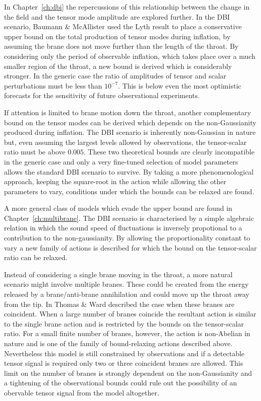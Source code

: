 In Chapter~\ref{ch:dbi} the repercussions of this relationship between the change in
the field and the tensor mode amplitude are explored further. In the DBI scenario,
Baumann \& McAllister \cite{bmpaper} used the Lyth result to place a conservative
upper bound on the total production of tensor modes during inflation, by assuming the
brane does not move further than the length of the throat. By considering only the
period of observable inflation, which takes place over a much smaller region of the
throat, a new bound is derived which is considerably stronger. In the generic
case the ratio of amplitudes of tensor and scalar perturbations must be less than
$10^{-7}$. This is below  even the most optimistic forecasts for
the sensitivity of future observational experiments. 

If attention is limited to brane motion down the throat, another complementary bound
on the tensor modes can be derived which depends on the non-Gaussianity produced
during inflation. The DBI scenario is inherently non-Gaussian in nature but, even
assuming the largest levels allowed by observations, the tensor-scalar ratio must be
above $0.005$. These two theoretical bounds are clearly incompatible in the generic
case and only a very fine-tuned selection of model parameters allows the standard DBI
scenario to survive. By taking a more phenomenological approach, keeping
the square-root in the action while allowing the other parameters to vary,
conditions under which the bounds can be relaxed are found.


A more general class of models which evade the upper bound are found in
Chapter~\ref{ch:multibrane}. The DBI scenario is characterised by a simple
algebraic relation in which the sound speed of fluctuations is inversely
propotional to a contribution to the non-gaussianity. By allowing the
proportionality constant to vary a new family of actions is described for which the
bound on the tensor-scalar ratio can be relaxed. 

Instead of considering a single brane moving in the throat, a more natural scenario
might involve multiple branes. These could be created from the energy released by a
brane/anti-brane annihilation and could move up the throat away from the tip.
In  Thomas \& Ward described the case when these branes are
coincident. When a large number of branes coincide the resultant action is similar
to the single brane action and is restricted by the bounds on the tensor-scalar
ratio. For a small finite number of branes, however, the action is non-Abelian in
nature and is one of the family of bound-relaxing actions described above.
Nevertheless this model is still constrained by observations and if a detectable
tensor signal is required only two or three coincident branes
are allowed. This limit on the number of branes is strongly dependent on the
non-Gaussianity and a tightening of the observational bounds could rule out the
possibility of an obervable tensor signal from the model altogether.


